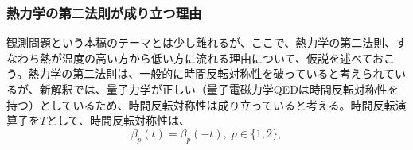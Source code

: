 \subsubsection{熱力学の第二法則が成り立つ理由}
観測問題という本稿のテーマとは少し離れるが、ここで、熱力学の第二法則、すなわち熱が温度の高い方から低い方に流れる理由について、仮説を述べておこう。熱力学の第二法則は、一般的に時間反転対称性を破っていると考えられているが、新解釈では、量子力学が正しい（量子電磁力学QEDは時間反転対称性を持つ）としているため、時間反転対称性は成り立っていると考える。時間反転演算子を$T$として、時間反転対称性は、
\begin{equation}
\label{eq:temperature_synmetry}
    \beta_p(t) = \beta_p(-t), \; p \in \{1,2\},
\end{equation}
\begin{,ultequation}
\begin{align}


\end{align}
\end{,ultequation}
